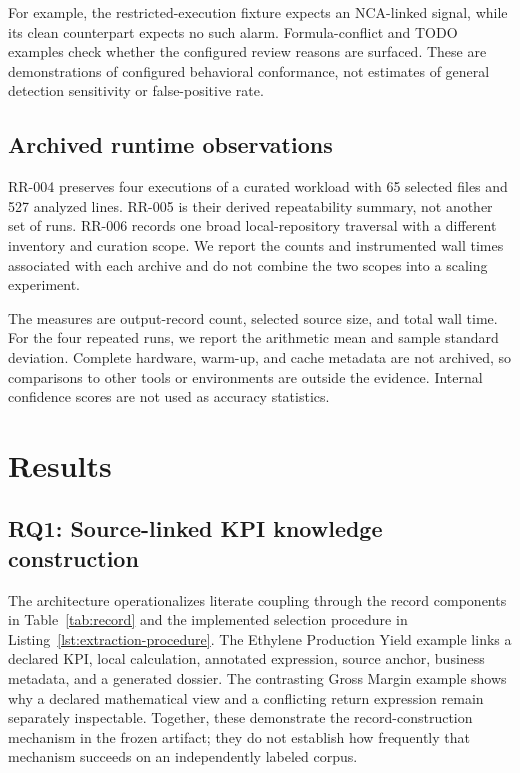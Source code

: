 \documentclass[a4paper,fleqn]{cas-dc}
\begin{document}
For example, the restricted-execution fixture expects an NCA-linked signal, while its clean counterpart expects no such alarm. Formula-conflict and TODO examples check whether the configured review reasons are surfaced. These are demonstrations of configured behavioral conformance, not estimates of general detection sensitivity or false-positive rate.

\subsection{Archived runtime observations}

RR-004 preserves four executions of a curated workload with 65 selected files and 527 analyzed lines. RR-005 is their derived repeatability summary, not another set of runs. RR-006 records one broad local-repository traversal with a different inventory and curation scope. We report the counts and instrumented wall times associated with each archive and do not combine the two scopes into a scaling experiment.

The measures are output-record count, selected source size, and total wall time. For the four repeated runs, we report the arithmetic mean and sample standard deviation. Complete hardware, warm-up, and cache metadata are not archived, so comparisons to other tools or environments are outside the evidence. Internal confidence scores are not used as accuracy statistics.


\section{Results}

\subsection{RQ1: Source-linked KPI knowledge construction}

The architecture operationalizes literate coupling through the record components in Table~\ref{tab:record} and the implemented selection procedure in Listing~\ref{lst:extraction-procedure}. The Ethylene Production Yield example links a declared KPI, local calculation, annotated expression, source anchor, business metadata, and a generated dossier. The contrasting Gross Margin example shows why a declared mathematical view and a conflicting return expression remain separately inspectable. Together, these demonstrate the record-construction mechanism in the frozen artifact; they do not establish how frequently that mechanism succeeds on an independently labeled corpus.
\end{document}
